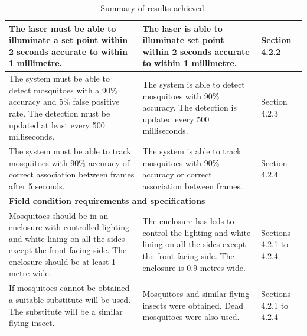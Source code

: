\begin{table}[H]
\begin{tabularx}{\textwidth}{|X|X|l|}
    \hline
    The laser must be able to illuminate a set point within 2 seconds accurate to within 1 millimetre.                                                                           &
    The laser is able to illuminate set point within 2 seconds accurate to within 1 millimetre.                                                                                  &
    Section 4.2.2                                                                                                                                                                                                                                                                                                                                                    \\
    \hline
    The system must be able to detect mosquitoes with a 90\% accuracy and 5\% false positive rate. The detection must be updated at least every 500 milliseconds.                & The system is able to detect mosquitoes with 90\% accuracy. The detection is updated every 500 milliseconds.                                            & Section 4.2.3           \\
    \hline
    The system must be able to track mosquitoes with 90\% accuracy of correct association between frames after 5 seconds.                                                        & The system is able to track mosquitoes with 90\% accuracy or correct association between frames.                                                        & Section 4.2.4           \\
    \hline
    \multicolumn{3}{|l|}{\textbf{Field condition requirements and specifications}}                                                                                                                                                                                                                                                                                   \\
    \hline
    Mosquitoes should be in an enclosure with controlled lighting and white lining on all the sides except the front facing side. The enclosure should be at least 1 metre wide. & The enclosure has \glspl{led} to control the lighting and white lining on all the sides except the front facing side. The enclosure is 0.9 metres wide. & Sections 4.2.1 to 4.2.4 \\
    \hline
    If mosquitoes cannot be obtained a suitable substitute will be used. The substitute will be a similar flying insect.                                                         & Mosquitoes and similar flying insects were obtained. Dead mosquitoes were also used.                                                                    & Sections 4.2.1 to 4.2.4 \\
    \hline
  \end{tabularx}
  \caption{Summary of results achieved.}
  \label{tab:results_summary}
\end{table}

